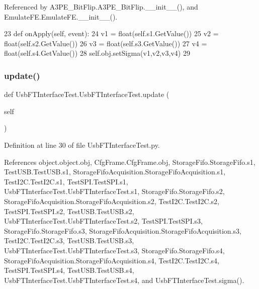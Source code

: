 Referenced by A3\+P\+E\+\_\+\+Bit\+Flip.\+A3\+P\+E\+\_\+\+Bit\+Flip.\+\_\+\+\_\+init\+\_\+\+\_\+(), and Emulate\+F\+E.\+Emulate\+F\+E.\+\_\+\+\_\+init\+\_\+\+\_\+().


\begin{DoxyCode}
23     \textcolor{keyword}{def }onApply(self, event):
24         v1 = float(self.s1.GetValue())
25         v2 = float(self.s2.GetValue())
26         v3 = float(self.s3.GetValue())
27         v4 = float(self.s4.GetValue())
28         self.obj.setSigma(v1,v2,v3,v4)
29 
\end{DoxyCode}
\mbox{\label{classUsbFTInterfaceTest_1_1UsbFTInterfaceTest_a26ed6de82b73e6e0c54bb429262d3c75}} 
\subsubsection{\texorpdfstring{update()}{update()}}
{\footnotesize\ttfamily def Usb\+F\+T\+Interface\+Test.\+Usb\+F\+T\+Interface\+Test.\+update (\begin{DoxyParamCaption}\item[{}]{self }\end{DoxyParamCaption})}



Definition at line 30 of file Usb\+F\+T\+Interface\+Test.\+py.



References object.\+object.\+obj, Cfg\+Frame.\+Cfg\+Frame.\+obj, Storage\+Fifo.\+Storage\+Fifo.\+s1, Test\+U\+S\+B.\+Test\+U\+S\+B.\+s1, Storage\+Fifo\+Acquisition.\+Storage\+Fifo\+Acquisition.\+s1, Test\+I2\+C.\+Test\+I2\+C.\+s1, Test\+S\+P\+I.\+Test\+S\+P\+I.\+s1, Usb\+F\+T\+Interface\+Test.\+Usb\+F\+T\+Interface\+Test.\+s1, Storage\+Fifo.\+Storage\+Fifo.\+s2, Storage\+Fifo\+Acquisition.\+Storage\+Fifo\+Acquisition.\+s2, Test\+I2\+C.\+Test\+I2\+C.\+s2, Test\+S\+P\+I.\+Test\+S\+P\+I.\+s2, Test\+U\+S\+B.\+Test\+U\+S\+B.\+s2, Usb\+F\+T\+Interface\+Test.\+Usb\+F\+T\+Interface\+Test.\+s2, Test\+S\+P\+I.\+Test\+S\+P\+I.\+s3, Storage\+Fifo.\+Storage\+Fifo.\+s3, Storage\+Fifo\+Acquisition.\+Storage\+Fifo\+Acquisition.\+s3, Test\+I2\+C.\+Test\+I2\+C.\+s3, Test\+U\+S\+B.\+Test\+U\+S\+B.\+s3, Usb\+F\+T\+Interface\+Test.\+Usb\+F\+T\+Interface\+Test.\+s3, Storage\+Fifo.\+Storage\+Fifo.\+s4, Storage\+Fifo\+Acquisition.\+Storage\+Fifo\+Acquisition.\+s4, Test\+I2\+C.\+Test\+I2\+C.\+s4, Test\+S\+P\+I.\+Test\+S\+P\+I.\+s4, Test\+U\+S\+B.\+Test\+U\+S\+B.\+s4, Usb\+F\+T\+Interface\+Test.\+Usb\+F\+T\+Interface\+Test.\+s4, and Usb\+F\+T\+Interface\+Test.\+sigma().



